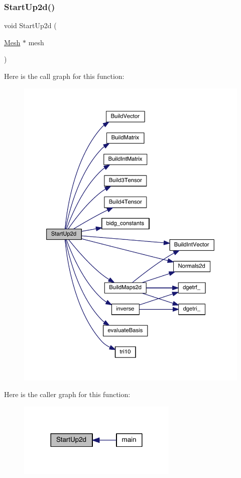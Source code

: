 \subsubsection{\texorpdfstring{Start\+Up2d()}{StartUp2d()}}
{\footnotesize\ttfamily void Start\+Up2d (\begin{DoxyParamCaption}\item[{\hyperlink{a00557_aeffbe0891ab73a4d8964c9cb7978426e}{Mesh} $\ast$}]{mesh }\end{DoxyParamCaption})}

Here is the call graph for this function\+:\nopagebreak
\begin{figure}[H]
\begin{center}
\leavevmode
\includegraphics[width=350pt]{a00554_a35ba318a20f8b83eefe63eeb1e1ac4b0_cgraph}
\end{center}
\end{figure}
Here is the caller graph for this function\+:\nopagebreak
\begin{figure}[H]
\begin{center}
\leavevmode
\includegraphics[width=216pt]{a00554_a35ba318a20f8b83eefe63eeb1e1ac4b0_icgraph}
\end{center}
\end{figure}
\mbox{\label{a00554_aefa0403a31ac7d229d0ca09dc0004d3e}} 
